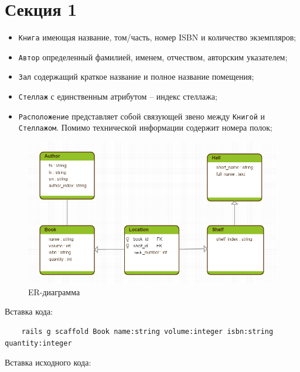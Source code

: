 \section{Секция 1}

\begin{itemize}
  \item \verb|Книга| имеющая название, том/часть, номер ISBN и количество экземпляров;
  \item \verb|Автор| определенный фамилией, именем, отчеством, авторским указателем;
  \item \verb|Зал| содержащий краткое название и полное название помещения;
  \item \verb|Стеллаж| с единственным атрибутом -- индекс стеллажа;
  \item \verb|Расположение| представляет собой связующей звено между \verb|Книгой|
  и \verb|Стеллажом|. Помимо технической информации содержит номера полок;
\end{itemize}

\begin{figure}[ht!]
  \begin{center}
    \includegraphics[scale=0.6]{images/erdiagramm.png}
  \end{center}
  \vspace*{-8mm}
  \caption{ER-диаграмма} \label{fig:erdiagramm}
\end{figure}

Вставка кода:
\begin{small}
  \begin{verbatim}
    rails g scaffold Book name:string volume:integer isbn:string quantity:integer
  \end{verbatim}
\end{small}

Вставка исходного кода:
\begin{small}
  
\end{small}
